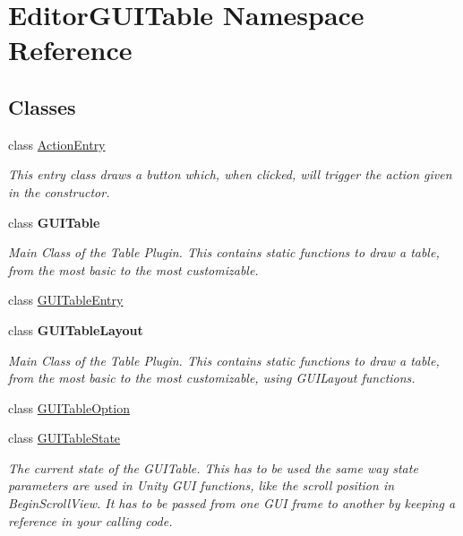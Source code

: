 \hypertarget{namespace_editor_g_u_i_table}{}\section{Editor\+G\+U\+I\+Table Namespace Reference}
\label{namespace_editor_g_u_i_table}
\subsection*{Classes}
\begin{DoxyCompactItemize}
\item 
class \mbox{\hyperlink{class_editor_g_u_i_table_1_1_action_entry}{Action\+Entry}}
\begin{DoxyCompactList}\small\item\em This entry class draws a button which, when clicked, will trigger the action given in the constructor. \end{DoxyCompactList}\item 
class {\bfseries G\+U\+I\+Table}
\begin{DoxyCompactList}\small\item\em Main Class of the Table Plugin. This contains static functions to draw a table, from the most basic to the most customizable. \end{DoxyCompactList}\item 
class \mbox{\hyperlink{class_editor_g_u_i_table_1_1_g_u_i_table_entry}{G\+U\+I\+Table\+Entry}}
\item 
class {\bfseries G\+U\+I\+Table\+Layout}
\begin{DoxyCompactList}\small\item\em Main Class of the Table Plugin. This contains static functions to draw a table, from the most basic to the most customizable, using G\+U\+I\+Layout functions. \end{DoxyCompactList}\item 
class \mbox{\hyperlink{class_editor_g_u_i_table_1_1_g_u_i_table_option}{G\+U\+I\+Table\+Option}}
\item 
class \mbox{\hyperlink{class_editor_g_u_i_table_1_1_g_u_i_table_state}{G\+U\+I\+Table\+State}}
\begin{DoxyCompactList}\small\item\em The current state of the G\+U\+I\+Table. This has to be used the same way state parameters are used in Unity G\+UI functions, like the scroll position in Begin\+Scroll\+View. It has to be passed from one G\+UI frame to another by keeping a reference in your calling code. \end{DoxyCompactList}\item 

\end{DoxyCompactItemize}
